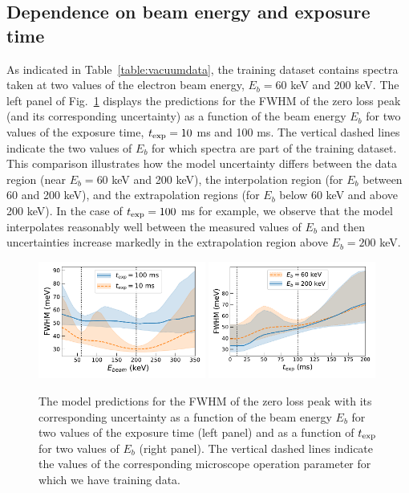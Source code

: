 \subsection{Dependence on beam energy and exposure time }
\label{eq:depebeam}

As indicated in Table~\ref{table:vacuumdata}, the training dataset contains
spectra taken at two values of the electron beam energy, $E_b=60$ keV and 200 keV.
%
The left panel of Fig.~\ref{fig:extrapolbeam} displays the predictions for the FWHM of the zero loss peak
(and its corresponding uncertainty) as a function of the beam energy $E_b$
for two values of the exposure time, $t_{\rm exp}=10$ ms and 100 ms.
%
The vertical dashed lines indicate the two values of $E_b$ for which spectra
are part of the training dataset.
%
This comparison illustrates how the model uncertainty differs between the data region
(near $E_b=60$ keV and 200 keV), the interpolation region (for $E_b$ between 60 and 200 keV),
and the extrapolation regions (for $E_b$ below 60 keV and above 200 keV).
%
In the case of $t_{\rm exp}=100$ ms for example, we observe that the model interpolates reasonably well
between the measured values of $E_b$ and then uncertainties increase
markedly in the extrapolation region above $E_b=200$ keV.
      
\begin{figure}[t]
    \centering
    \includegraphics[width=0.49\textwidth]{plots/Ebeam_extrapolation.pdf}
    \includegraphics[width=0.49\textwidth]{plots/time_extrapolation.pdf}
    \caption{\small The model predictions for the FWHM of the zero loss peak
      with its corresponding uncertainty as a function of the beam energy $E_b$
      for two values of the exposure time (left panel)
      and as a function of $t_{\rm exp}$ for two values of $E_b$ (right panel).
      The vertical dashed lines indicate the values of the
      corresponding microscope operation parameter for which we have training data.
    }
    \label{fig:extrapolbeam}
\end{figure}

